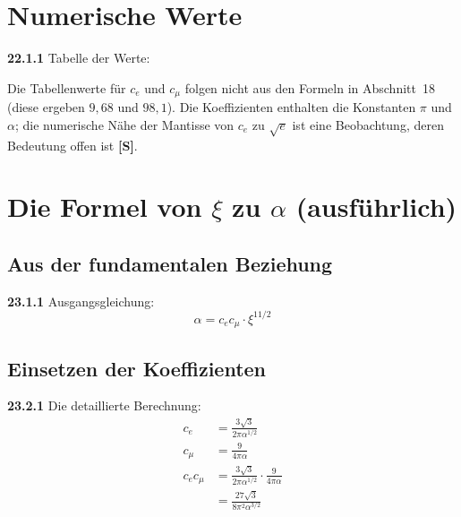 \section{Numerische Werte}

\noindent \textbf{22.1.1} Tabelle der Werte:

\begin{table}[h]
	\centering
\end{table}

Die Tabellenwerte für $c_e$ und $c_\mu$ folgen nicht aus den Formeln in Abschnitt~18 (diese ergeben $9{,}68$ und $98{,}1$). Die Koeffizienten enthalten die Konstanten $\pi$ und $\alpha$; die numerische Nähe der Mantisse von $c_e$ zu $\sqrt{e}$ ist eine Beobachtung, deren Bedeutung offen ist \textbf{[S]}.

\section{Die Formel von $\xi$ zu $\alpha$ (ausführlich)}

\subsection{Aus der fundamentalen Beziehung}
\noindent \textbf{23.1.1} Ausgangsgleichung:
\begin{equation}
	\alpha = c_e c_\mu \cdot \xi^{11/2}
\end{equation}

\subsection{Einsetzen der Koeffizienten}
\noindent \textbf{23.2.1} Die detaillierte Berechnung:
\begin{align}
	c_e &= \frac{3\sqrt{3}}{2\pi\alpha^{1/2}} \\
	c_\mu &= \frac{9}{4\pi\alpha} \\
	c_e c_\mu &= \frac{3\sqrt{3}}{2\pi\alpha^{1/2}} \cdot \frac{9}{4\pi\alpha} \\
	&= \frac{27\sqrt{3}}{8\pi^2\alpha^{3/2}}
\end{align}

